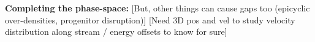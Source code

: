 \documentclass[12pt]{article}
\begin{document}
{\bf Completing the phase-space:}
[But, other things can cause gaps too (epicyclic over-densities, progenitor disruption)]
[Need 3D pos and vel to study velocity distribution along stream / energy offsets to know for sure]

%
%
%
\end{document}
